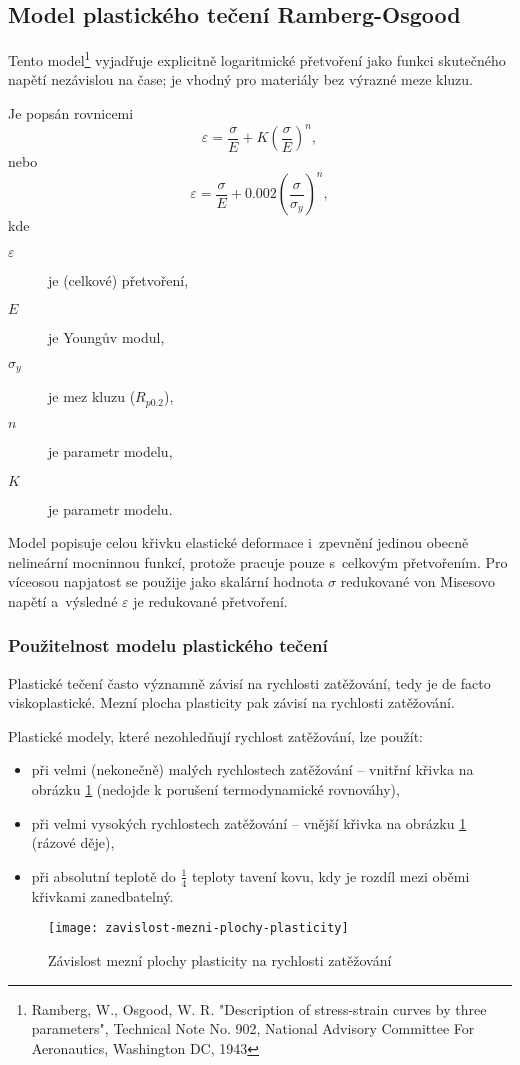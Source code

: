 
\subsection{Model plastického tečení Ramberg-Osgood}\label{sec:ramberg-osgood}
Tento model\footnote{Ramberg, W., Osgood, W. R. "Description of stress-strain curves by three parameters", Technical Note No. 902, National Advisory Committee For Aeronautics, Washington DC, 1943} vyjadřuje explicitně logaritmické přetvoření jako funkci skutečného napětí nezávislou na čase; je vhodný pro materiály bez výrazné meze kluzu.

Je popsán rovnicemi
\begin{equation}
	\varepsilon = \frac{\sigma}{E} + K \left( \frac{\sigma}{E} \right)^n,
\end{equation}
nebo
\begin{equation}
	\varepsilon = \frac{\sigma}{E} + 0.002 \left( \frac{\sigma}{\sigma_y} \right)^n,
\end{equation}
kde
\begin{description}
	\item[$\varepsilon$] je (celkové) přetvoření,
	\item[$E$] je Youngův modul,
	\item[$\sigma_y$] je mez kluzu ($R_{p0.2}$),
	\item[$n$] je parametr modelu,
	\item[$K$] je parametr modelu.
\end{description}

Model popisuje celou křivku elastické deformace i~zpevnění jedinou obecně nelineární mocninnou funkcí, protože pracuje pouze s~celkovým přetvořením.
Pro víceosou napjatost se použije jako skalární hodnota $\sigma$ redukované von Misesovo napětí a~výsledné $\varepsilon$ je redukované přetvoření.

\subsubsection{Použitelnost modelu plastického tečení}
Plastické tečení často významně závisí na rychlosti zatěžování, tedy je de facto viskoplastické.
Mezní plocha plasticity pak závisí na rychlosti zatěžování.

Plastické modely, které nezohledňují rychlost zatěžování, lze použít:
\begin{itemize}
	\item při velmi (nekonečně) malých rychlostech zatěžování -- vnitřní křivka na obrázku \ref{fig:mezni_plocha_plasticity} (nedojde k porušení termodynamické rovnováhy),
	\item při velmi vysokých rychlostech zatěžování -- vnější křivka na obrázku \ref{fig:mezni_plocha_plasticity} (rázové děje),
	\item při absolutní teplotě do $\frac{1}{4}$ teploty tavení kovu, kdy je rozdíl mezi oběmi křivkami zanedbatelný.
\end{itemize}

\begin{figure}[H]
	\centering
	\texttt{[image: zavislost-mezni-plochy-plasticity]}
	\caption{Závislost mezní plochy plasticity na rychlosti zatěžování}
	\label{fig:mezni_plocha_plasticity}
\end{figure}
